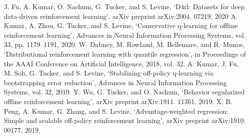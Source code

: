 \documentclass[conference]{IEEEtran}
\begin{document}
\begin{thebibliography}{00}
J. Fu, A. Kumar, O. Nachum, G. Tucker, and S. Levine, ‘D4rl: Datasets for deep data-driven
reinforcement learning’, arXiv preprint arXiv:2004. 07219, 2020
A. Kumar, A. Zhou, G. Tucker, and S. Levine, ‘Conservative q-learning for offline
reinforcement learning’, Advances in Neural Information Processing Systems, vol. 33, pp.
1179–1191, 2020.
 W. Dabney, M. Rowland, M. Bellemare, and R. Munos, ‘Distributional reinforcement learning
with quantile regression’, in Proceedings of the AAAI Conference on Artificial Intelligence,
2018, vol. 32.
A. Kumar, J. Fu, M. Soh, G. Tucker, and S. Levine, ‘Stabilizing off-policy q-learning via
bootstrapping error reduction’, Advances in Neural Information Processing Systems, vol. 32,
2019.
Y. Wu, G. Tucker, and O. Nachum, ‘Behavior regularized offline reinforcement learning’, arXiv
preprint arXiv:1911. 11361, 2019.
 X. B. Peng, A. Kumar, G. Zhang, and S. Levine, ‘Advantage-weighted regression: Simple and
scalable off-policy reinforcement learning’, arXiv preprint arXiv:1910. 00177, 2019.
\end{thebibliography}
\end{document}
